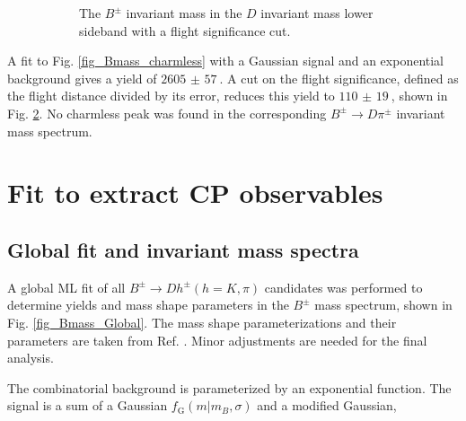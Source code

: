 \documentclass[12pt, a4paper, notitlepage, onecolumn]{article}
\numberwithin{equation}{section}
\begin{document}
\begin{figure}[H]
\begin{subfigure}{0.5\textwidth}
    \caption{The $B^\pm$ invariant mass in the $D$ invariant mass lower sideband with a flight significance cut.}
    \label{fig_Bmass_charmless_fdcut}
  \end{subfigure}
  \caption{}
\end{figure}

A fit to Fig. \ref{fig_Bmass_charmless} with a Gaussian signal and an exponential background gives a yield of $\SI{2605(57)}{}$. A cut on the flight significance, defined as the flight distance divided by its error, reduces this yield to $\SI{110(19)}{}$, shown in Fig. \ref{fig_Bmass_charmless_fdcut}. No charmless peak was found in the corresponding $B^\pm\to D\pi^\pm$ invariant mass spectrum.

\section{Fit to extract CP observables}
\subsection{Global fit and invariant mass spectra}
\label{section_global_fit}
\noindent A global ML fit of all $B^\pm\to Dh^\pm (h = K, \pi)$ candidates was performed to determine yields and mass shape parameters in the $B^\pm$ mass spectrum, shown in Fig. \ref{fig_Bmass_Global}. The mass shape parameterizations and their parameters are taken from Ref. \cite{cite_LHCbGGSZKSpipi}. Minor adjustments are needed for the final analysis.

The combinatorial background is parameterized by an exponential function. The signal is a sum of a Gaussian $f_\text{G}(m|m_B, \sigma)$ and a modified Gaussian,
\end{document}
